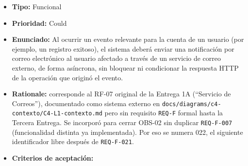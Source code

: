 \documentclass[
  spanish,
]{article}
\providecommand{\tightlist}{%
  \setlength{\itemsep}{0pt}\setlength{\parskip}{0pt}}
\begin{document}
\begin{itemize}
\tightlist
\item
  \textbf{Tipo:} Funcional
\item
  \textbf{Prioridad:} Could
\item
  \textbf{Enunciado:} Al ocurrir un evento relevante para la cuenta de
  un usuario (por ejemplo, un registro exitoso), el sistema deberá
  enviar una notificación por correo electrónico al usuario afectado a
  través de un servicio de correo externo, de forma asíncrona, sin
  bloquear ni condicionar la respuesta HTTP de la operación que originó
  el evento.
\item
  \textbf{Rationale:} corresponde al RF-07 original de la Entrega 1A
  (``Servicio de Correos''), documentado como sistema externo en
  \texttt{docs/\allowbreak{}diagrams/\allowbreak{}c4-\allowbreak{}contexto/\allowbreak{}C4-\allowbreak{}L1-\allowbreak{}contexto.\allowbreak{}md} pero sin
  requisito \texttt{REQ-\allowbreak{}F} formal hasta la Tercera Entrega. Se incorporó
  para cerrar OBS-02 sin duplicar \texttt{REQ-\allowbreak{}F-\allowbreak{}007} (funcionalidad
  distinta ya implementada). Por eso se numera 022, el siguiente
  identificador libre después de \texttt{REQ-\allowbreak{}F-\allowbreak{}021}.
\item
  \textbf{Criterios de aceptación:}


\end{itemize}
\end{document}
